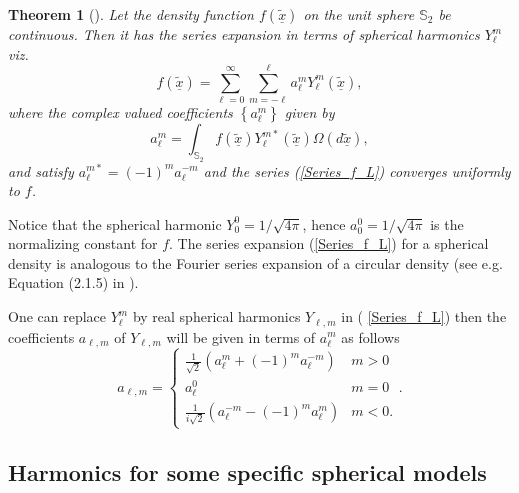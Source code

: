 \documentclass[preprint,11pt,a4paper]{elsarticle}
\newtheorem{theorem}{Theorem}
\begin{document}
\begin{theorem}[\protect\cite{Mueller1966}]
Let the density function $f\left( \underline{\widetilde{x}}\right) $ on the
unit sphere $\mathbb{S}_{2}$ be continuous. Then it has the series expansion
in terms of spherical harmonics $Y_{\ell}^{m}$ viz. 
\begin{equation}
f\left( \underline{\widetilde{x}}\right)
=\sum_{\ell=0}^{\infty}\sum_{m=-\ell}^{\ell}a_{\ell}^{m}Y_{\ell}^{m}\left( 
\underline{\widetilde{x}}\right) ,  \label{Series_f_L}
\end{equation}
where the complex valued coefficients $\left\{ a_{\ell}^{m}\right\} $ given
by 
\begin{equation}
a_{\ell}^{m}=\int_{\mathbb{S}_{2}}f\left( \underline{\widetilde{x}}\right)
Y_{\ell}^{m\ast}\left( \underline{\widetilde{x}}\right) \Omega\left( d%
\underline{\widetilde{x}}\right) ,  \label{a_l_m}
\end{equation}
and satisfy $a_{\ell}^{m\ast}=\left( -1\right) ^{m}a_{\ell}^{-m}$ and the
series (\ref{Series_f_L}) converges uniformly to $f$.
\end{theorem}

Notice that the spherical harmonic $Y_{0}^{0}=1/\sqrt{4\pi}$, hence $%
a_{0}^{0}=1/\sqrt{4\pi}$ is the normalizing constant for $f$. The series
expansion (\ref{Series_f_L}) for a spherical density is analogous to the
Fourier series expansion of a circular density (see e.g. Equation (2.1.5) in 
\cite{jammalamadaka2001topics}).

One can replace $Y_{\ell}^{m}$ by real spherical harmonics $Y_{\ell,m}$ in (%
\ref{Series_f_L}) then the coefficients $a_{\ell,m}$ of $Y_{\ell,m}$ will be
given in terms of $a_{\ell}^{m}$ as follows 
\begin{equation*}
a_{\ell,m}=\left\{ 
\begin{array}{cc}
\frac{1}{\sqrt{2}}\left( a_{\ell}^{m}+\left( -1\right)
^{m}a_{\ell}^{-m}\right) & m>0 \\ 
a_{\ell}^{0} & m=0 \\ 
\frac{1}{i\sqrt{2}}\left( a_{\ell}^{-m}-\left( -1\right)
^{m}a_{\ell}^{m}\right) & m<0.%
\end{array}
\right. .
\end{equation*}

\subsection{Harmonics for some specific spherical models}
\end{document}
